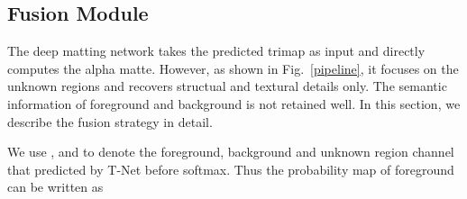 \begin{comment}
\textbf{Implementation details:} Although our human matting dataset has more than 34k human instances, most of them are models from an e-commerce website and have much less complex structural details as shown in the last three columns in Fig. \ref{dataset_intro}. It is vulnerable to overfitting if we train our M-Net on this dataset directly. Therefore, before end to end training detailed in the next section, we train a much general matting model on the general matting dataset provided by Xu et al. \cite{xu2017deep}. Specifically, we filter out the 20 human alpha mattes with their foregrounds from this general matting dataset and obtain 411 alpha mattes with their foregrounds as our training dataset in this stage. We then composite this 411 foregrounds onto 41100 backgrounds (100 backgrounds per foreground) with corresponding ground truth alpha mattes. It is noting that this 41100 images contains kinds of objects as foregrounds including human and the foregrounds and backgrounds used in our human matting test dataset described before do not appear in this training dataset. We augment this general dataset similar to \cite{xu2017deep}. We find it is crucial for the performance of M-Net to augment the kernel sizes of erosion and dilation that operated on the alpha mattes to generated trimaps online.

As the encoder part of our M-Net is the same as the convolutional parts of the batch normalization version of VGG16 except for the first layer, we initialize these layers with the weights trained on ImageNet. For the first layer, we initialize the extra 3 channels with zeros. For the decoder parts, we initialize them with Xavier. We select Adam as our optimizer. We first set the learning rate to be , when the validation loss no longer descend, we set it to  until the model converged.
\end{comment}

\subsection{Fusion Module}
The deep matting network takes the predicted trimap as input and directly computes the alpha matte.
However, as shown in Fig.~\ref{pipeline}, it focuses on the unknown regions and recovers structual and textural details only.
The semantic information of foreground and background is not retained well.
In this section, we describe the fusion strategy in detail.

We use ,  and  to denote the foreground, background and unknown region channel that predicted by T-Net before softmax. Thus the probability map of foreground  can be written as

